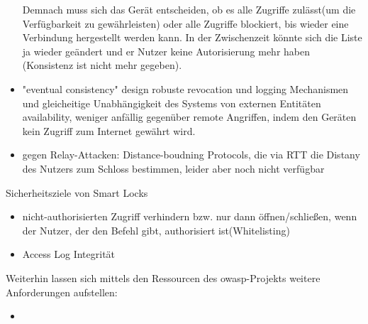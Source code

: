 \begin{itemize}
        Demnach muss sich das Gerät entscheiden, ob es alle Zugriffe zulässt(um die Verfügbarkeit zu gewährleisten) oder alle Zugriffe blockiert, bis wieder eine Verbindung hergestellt werden kann.
        In der Zwischenzeit könnte sich die Liste ja wieder geändert und er Nutzer keine Autorisierung mehr haben (Konsistenz ist nicht mehr gegeben).
        \item \textrightarrow "eventual consistency" design \textrightarrow robuste revocation und logging Mechanismen und gleicheitige Unabhängigkeit des Systems von externen Entitäten\cite{Ho2016} \textrightarrow availability, weniger anfällig gegenüber remote Angriffen, indem den Geräten kein Zugriff zum Internet gewährt wird.
        \item gegen Relay-Attacken: Distance-boudning Protocols, die via RTT die Distany des Nutzers zum Schloss bestimmen, leider aber noch nicht verfügbar\cite{Ho2016}   
    \end{itemize}
    
    Sicherheitsziele von Smart Locks\cite{Ho2016}
    \begin{itemize}
        \item nicht-authorisierten Zugriff verhindern bzw. nur dann öffnen/schließen, wenn der Nutzer, der den Befehl gibt, authorisiert ist(Whitelisting)
        \item Access Log Integrität
    \end{itemize}
	
	Weiterhin lassen sich mittels den Ressourcen des \gls{owasp}-Projekts\cite{Miessler2015}\cite{Miessler2015a} weitere Anforderungen aufstellen:
	\begin{itemize}
	    \item 
	\end{itemize}